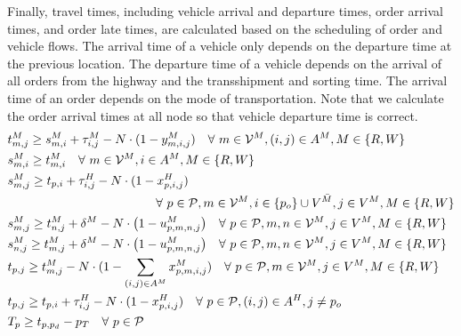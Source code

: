 \documentclass[12pt]{article}
\numberwithin{equation}{section}
\begin{document}
	Finally, travel times, including vehicle arrival and departure times, order arrival times, and order late times, are calculated based on the scheduling of order and vehicle flows. The arrival time of a vehicle only depends on the departure time at the previous location. The departure time of a vehicle depends on the arrival of all orders from the highway and the transshipment and sorting time. The arrival time of an order depends on the mode of transportation. Note that we calculate the order arrival times at all node so that vehicle departure time is correct.
	\begin{align}
	&t^M_{m, j}\ge s^M_{m, i} + \tau^M_{i, j}-N\cdot (1-y^M_{m, i, j})\quad\forall\ m\in \mathcal{V}^M, (i, j)\in A^M, M\in\{R, W\}\label{eq:vehicle_arrival}\\
	&s^M_{m, i}\ge t^M_{m, i}\quad\forall\ m\in \mathcal{V}^M, i\in A^M, M\in\{R, W\}\label{eq:arrival_departure}\\
	&s^M_{m, j}\ge t_{p, i} + \tau^H_{i, j} - N\cdot(1-x^H_{p, i, j})\notag\\
	&\text{\hspace{120pt}}\forall\ p\in\mathcal{P}, m\in\mathcal{V}^M, i\in \{p_o\}\cup V^{\bar{M}}, j\in V^M, M\in\{R, W\}\label{eq:vehicle_highway}\\
	&s^M_{m, j}\ge t^M_{n, j} + \delta^M - N\cdot\big(1 - u^M_{p, m, n, j}\big)\quad\forall\ p\in\mathcal{P}, m, n\in\mathcal{V}^M, j\in V^M, M\in\{R, W\}\label{eq:transship_m_n}\\
	&s^M_{n, j}\ge t^M_{m, j} + \delta^M - N\cdot\big(1 - u^M_{p, m, n, j}\big)\quad\forall\ p\in\mathcal{P}, m, n\in\mathcal{V}^M, j\in V^M, M\in\{R, W\}\label{eq:transship_n_m}\\
	&t_{p, j}\ge t^M_{m, j} - N\cdot (1 - \sum_{(i, j)\in A^M}x^M_{p, m, i, j})\quad\forall\ p\in\mathcal{P}, m\in \mathcal{V}^M, j\in V^M, M\in\{R, W\}\label{eq:order_rail_water}\\
	&t_{p, j}\ge t_{p, i} + \tau^H_{i, j} - N\cdot (1 - x^H_{p, i, j})\quad\forall\ p\in\mathcal{P}, (i,j)\in A^H, j\ne p_o\label{eq:order_highway}\\
	&T_{p}\ge t_{p, p_d} - p_T\quad\forall\ p\in\mathcal{P}\label{eq:late_time}
\end{align}
\end{document}
